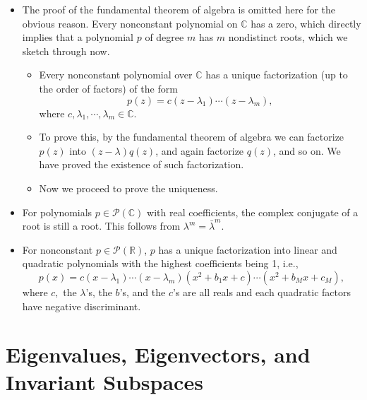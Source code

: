 \documentclass{article}
\newcommand{\R}{\mathbb{R}}
\newcommand{\C}{\mathbb{C}}
\begin{document}
\begin{itemize}
    \item The proof of the fundamental theorem of algebra is omitted here for the obvious reason. Every nonconstant polynomial on $\C$ has a zero, which directly implies that a polynomial $p$ of degree $m$ has $m$ nondistinct roots, which we sketch through now.
    \begin{itemize}
        \item Every nonconstant polynomial over $\C$ has a unique factorization (up to the order of factors) of the form $$p(z) = c(z - \lambda_1)\cdots(z-\lambda_m),$$ where $c, \lambda_1,\cdots,\lambda_m \in \C$.
    \end{itemize}
    \begin{itemize}
        \item To prove this, by the fundamental theorem of algebra we can factorize $p(z)$ into $(z-\lambda)q(z)$, and again factorize $q(z)$, and so on. We have proved the existence of such factorization.
        \item Now we proceed to prove the uniqueness. 
    \end{itemize}
    \item For polynomials $p \in \mathcal{P}(\C)$ with real coefficients, the complex conjugate of a root is still a root. This follows from $\lambda^m = \bar{\lambda}^m$.
    
    \item For nonconstant $p \in \mathcal{P}(\R)$, $p$ has a unique factorization into linear and quadratic polynomials with the highest coefficients being 1, i.e., $$p(x)=c(x-\lambda_1)\cdots(x-\lambda_m)(x^2+b_1x+c)\cdots(x^2+b_Mx+c_M),$$ where $c,$ the $\lambda$'s, the $b$'s, and the $c$'s are all reals and each quadratic factors have negative discriminant.
\end{itemize}


\section{Eigenvalues, Eigenvectors, and Invariant Subspaces}
\end{document}
